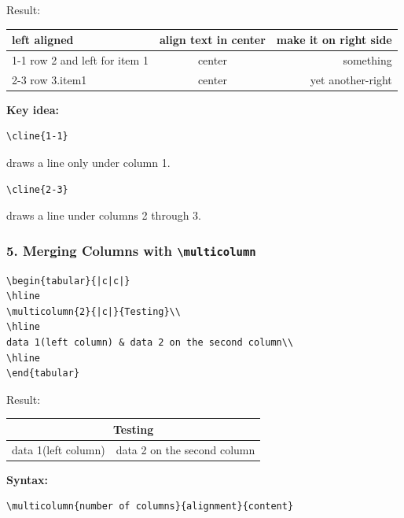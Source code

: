 \documentclass[a4paper,10pt]{article}
\begin{document}
Result:

\begin{center}
\begin{tabular}{|l|c|r|}
\hline
left aligned & align text in center & make it on right side\\
\cline{1-1}
row 2 and left for item 1 & center & something\\
\cline{2-3}
row 3.item1 & center & yet another-right\\
\hline
\end{tabular}
\end{center}

\textbf{Key idea:}

\begin{verbatim}
\cline{1-1}
\end{verbatim}

draws a line only under column 1.

\begin{verbatim}
\cline{2-3}
\end{verbatim}

draws a line under columns 2 through 3.


\subsubsection{5. Merging Columns with \texttt{\textbackslash multicolumn}}

\begin{verbatim}
\begin{tabular}{|c|c|}
\hline
\multicolumn{2}{|c|}{Testing}\\
\hline
data 1(left column) & data 2 on the second column\\
\hline
\end{tabular}
\end{verbatim}

Result:

\begin{center}
\begin{tabular}{|c|c|}
\hline
\multicolumn{2}{|c|}{Testing}\\
\hline
data 1(left column) & data 2 on the second column\\
\hline
\end{tabular}
\end{center}

\textbf{Syntax:}

\begin{verbatim}
\multicolumn{number of columns}{alignment}{content}
\end{verbatim}
\end{document}
